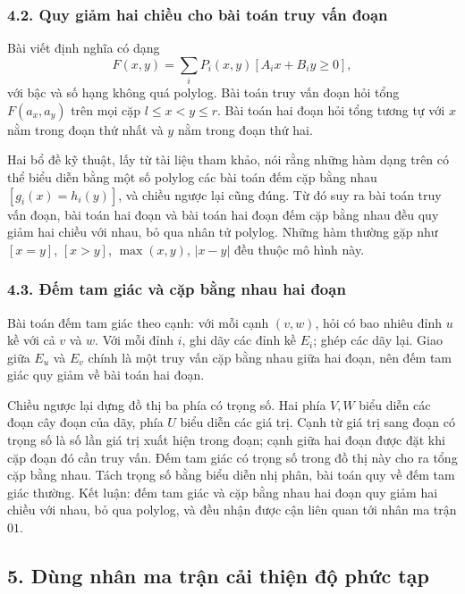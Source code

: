 \documentclass[11pt]{article}
\begin{document}
\subsubsection*{4.2. Quy giảm hai chiều cho bài toán truy vấn đoạn}

Bài viết định nghĩa  có dạng
\[
  F(x,y)=\sum_i P_i(x,y)[A_ix+B_iy\ge0],
\]
với bậc và số hạng không quá polylog. Bài toán truy vấn đoạn hỏi tổng
\(F(a_x,a_y)\) trên mọi cặp \(l\le x<y\le r\). Bài toán hai đoạn hỏi tổng tương
tự với \(x\) nằm trong đoạn thứ nhất và \(y\) nằm trong đoạn thứ hai.

Hai bổ đề kỹ thuật, lấy từ tài liệu tham khảo, nói rằng những hàm dạng trên có
thể biểu diễn bằng một số polylog các bài toán đếm cặp bằng nhau
\([g_i(x)=h_i(y)]\), và chiều ngược lại cũng đúng. Từ đó suy ra bài toán truy
vấn đoạn, bài toán hai đoạn và bài toán hai đoạn đếm cặp bằng nhau đều quy giảm
hai chiều với nhau, bỏ qua nhân tử polylog. Những hàm thường gặp như
\([x=y]\), \([x>y]\), \(\max(x,y)\), \(|x-y|\) đều thuộc mô hình này.

\subsubsection*{4.3. Đếm tam giác và cặp bằng nhau hai đoạn}

Bài toán đếm tam giác theo cạnh: với mỗi cạnh \((v,w)\), hỏi có bao nhiêu đỉnh
\(u\) kề với cả \(v\) và \(w\). Với mỗi đỉnh \(i\), ghi dãy các đỉnh kề
\(E_i\); ghép các dãy lại. Giao giữa \(E_u\) và \(E_v\) chính là một truy vấn
cặp bằng nhau giữa hai đoạn, nên đếm tam giác quy giảm về bài toán hai đoạn.

Chiều ngược lại dựng đồ thị ba phía có trọng số. Hai phía \(V,W\) biểu diễn các
đoạn cây đoạn của dãy, phía \(U\) biểu diễn các giá trị. Cạnh từ giá trị sang
đoạn có trọng số là số lần giá trị xuất hiện trong đoạn; cạnh giữa hai đoạn
được đặt khi cặp đoạn đó cần truy vấn. Đếm tam giác có trọng số trong đồ thị
này cho ra tổng cặp bằng nhau. Tách trọng số bằng biểu diễn nhị phân, bài toán
quy về đếm tam giác thường. Kết luận: đếm tam giác và cặp bằng nhau hai đoạn
quy giảm hai chiều với nhau, bỏ qua polylog, và đều nhận được cận liên quan tới
nhân ma trận \(01\).

\subsection*{5. Dùng nhân ma trận cải thiện độ phức tạp}
\end{document}
